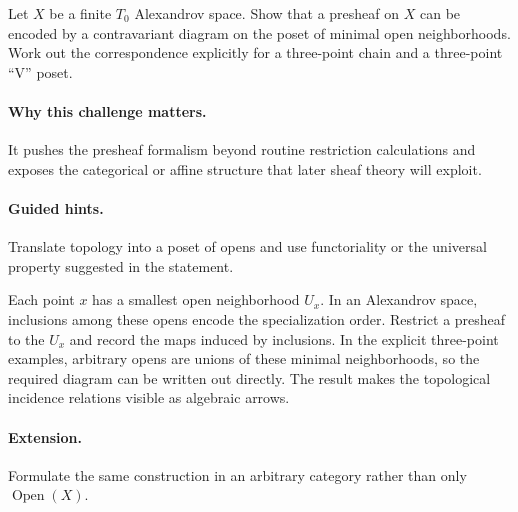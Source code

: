 \begin{problem}
Let $X$ be a finite $T_0$ Alexandrov space.  Show that a presheaf on $X$ can be encoded by a contravariant diagram on the poset of minimal open neighborhoods.  Work out the correspondence explicitly for a three-point chain and a three-point ``V'' poset.
\end{problem}

\paragraph{Why this challenge matters.}
It pushes the presheaf formalism beyond routine restriction calculations and exposes the
categorical or affine structure that later sheaf theory will exploit.

\paragraph{Guided hints.}
Translate topology into a poset of opens and use functoriality or the universal property
suggested in the statement.

\begin{solution}
Each point $x$ has a smallest open neighborhood $U_x$.  In an Alexandrov space, inclusions among these opens encode the specialization order.  Restrict a presheaf to the $U_x$ and record the maps induced by inclusions.  In the explicit three-point examples, arbitrary opens are unions of these minimal neighborhoods, so the required diagram can be written out directly.  The result makes the topological incidence relations visible as algebraic arrows.
\end{solution}

\paragraph{Extension.}
Formulate the same construction in an arbitrary category rather than only
$\operatorname{Open}(X)$.
